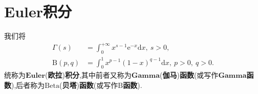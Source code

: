 \documentclass[../../main.tex]{subfiles}%
\begin{document}
\section{Euler积分}

\begin{definition}
我们将
\begin{align}
\Gamma(s) &= \int_{0}^{+\infty} x^{s-1} \mathrm{e}^{-x} \mathrm{d}x,\ s > 0, \label{eq::020290rj30jr0jwef-1} \\
\mathrm{B}(p,q) &= \int_{0}^{1} x^{p-1} (1-x)^{q-1} \mathrm{d}x,\ p > 0,\ q > 0 .\label{eq::020290rj30jr0jwef-2}
\end{align}
统称为$\mathbf{Euler}$(\textbf{欧拉})\textbf{积分},其中前者又称为$\mathbf{Gamma}$(\textbf{伽马})\textbf{函数}(或写作$\mathbf{Gamma}$\textbf{函数}),后者称为$\mathrm{Beta}$(\textbf{贝塔})\textbf{函数}(或写作$\mathrm{B}$\textbf{函数}).
\end{definition}
\end{document}
